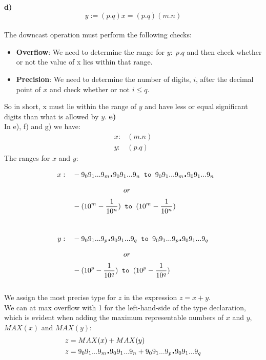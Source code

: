 \textbf{d)}\\
$$
  y:= (p.q)x = (p.q)(m.n)
$$
\\
The downcast operation must perform the following checks:
\begin{itemize}
  \item \textbf{Overflow}: We need to determine the range for $y:\; p.q$ and then check whether or not the value of x lies within that range.
  \item \textbf{Precision}: We need to determine the number of digits, $i$, after the decimal point of $x$ and check whether or not $i \leq q$.
\end{itemize}
So in short, x must lie within the range of $y$ and have less or equal significant digits than what is allowed by $y$.
\newpage
\textbf{e)}\\
In e), f) and g) we have:
\begin{align*}
       x:& (m.n)\\
       y:& (p.q)
\end{align*}
The ranges for $x$ and $y$:
\begin{align*}
  x:\quad & - 9_09_1...9_m {\Large \textbf{.}} 9_09_1...9_n \texttt{ to } 9_09_1...9_m{\Large \textbf{.}}9_09_1...9_n\\
    &\hspace{25mm} or \\
  & - (10^m - \frac{1}{10^n} ) \texttt{ to }  (10^m - \frac{1}{10^n} )\\
  \hspace{1cm}\\
  y:\quad & - 9_09_1...9_p {\Large \textbf{.}} 9_09_1...9_q \texttt{ to } 9_09_1...9_p {\Large \textbf{.}} 9_09_1...9_q\\
  &\hspace{25mm} or \\
  & - (10^p - \frac{1}{10^q} ) \texttt{ to }  (10^p - \frac{1}{10^q} )
\end{align*}
\\
We assign the most precise type for $z$ in the expression $z= x+y$.\\
We can at max overflow with 1 for the left-hand-side of the type declaration, which is evident when adding the maximum representable numbers of $x$ and $y$, $MAX(x)$ and $MAX(y)$:
\begin{align*}
  z &= MAX(x) + MAX(y)\\
  z &=  9_09_1...9_m{\Large \textbf{.}}9_09_1...9_n + 9_09_1...9_p {\Large \textbf{.}} 9_09_1...9_q
\end{align*}
